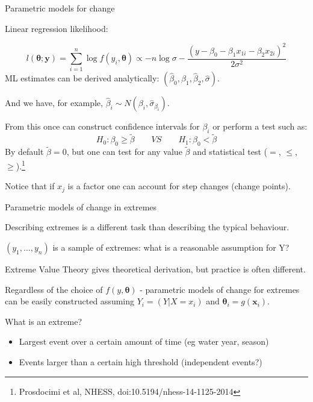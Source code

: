 \documentclass[
  10pt,
  ignorenonframetext,
  compress]{beamer}
\providecommand{\tightlist}{%
  \setlength{\itemsep}{0pt}\setlength{\parskip}{0pt}}
\begin{document}
\begin{frame}{Parametric models for change}
\protect\hypertarget{parametric-models-for-change-1}{}

Linear regression likelihood:

\[l(\boldsymbol{\theta}; \boldsymbol{y}) = \sum_{i=1}^{n} \log f(y_i, \boldsymbol{\theta}) \propto - n \log \sigma - \frac{(y-\beta _0 - \beta_1 x_{1i} - \beta_2 x_{2i})^2}{2 \sigma^2} \]
ML estimates can be derived analytically:
\((\hat{\beta}_0, \hat{\beta}_1,\hat{\beta}_2,\hat{\sigma})\).

And we have, for example,
\(\hat{\beta}_i \sim N(\beta_i, \hat{\sigma}_{\beta_i})\).

\pause

From this once can construct confidence intervals for \(\beta_i\) or
perform a test such as:
\[H_0: \beta_0 \geq \tilde{\beta} \quad \quad VS  \quad \quad H_1: \beta_0 < \tilde{\beta}\]
By default \(\tilde{\beta} = 0\), but one can test for any value
\(\tilde{\beta}\) and statistical test (\(=\), \(\leq\),
\(\geq\)).\footnote{Prosdocimi et al, NHESS, doi:10.5194/nhess-14-1125-2014}

Notice that if \(x_j\) is a factor one can account for step changes
(change points).

\end{frame}

\begin{frame}{Parametric models of change in extremes}
\protect\hypertarget{parametric-models-of-change-in-extremes}{}

Describing extremes is a different task than describing the typical
behaviour.

\((y_1, \ldots, y_n)\) is a sample of extremes: what is a reasonable
assumption for Y?

Extreme Value Theory gives theoretical derivation, but practice is often
different.

Regardless of the choice of \(f(y, \boldsymbol{\theta})\) - parametric
models of change for extremes can be easily constructed assuming
\(Y_i=(Y|X=x_i)\) and \(\boldsymbol{\theta}_i = g(\boldsymbol{x}_i)\).

\pause

What is an extreme?

\begin{itemize}
\tightlist
\item
  Largest event over a certain amount of time (eg water year, season)
\item
  Events larger than a certain high threshold (independent events?)
\end{itemize}

\end{frame}
\end{document}
